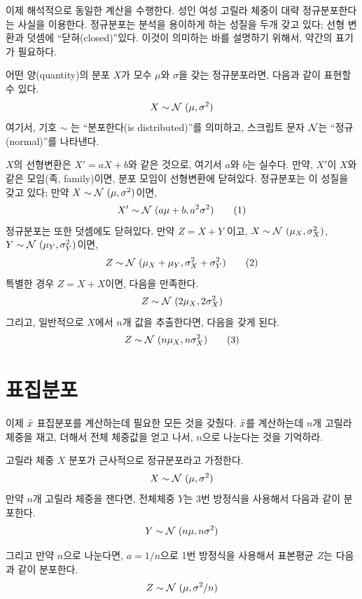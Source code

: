 이제 해석적으로 동일한 계산을 수행한다. 성인 여성 고릴라 체중이 대략 정규분포한다는 사실을 이용한다.
정규분포는 분석을 용이하게 하는 성질을 두개 갖고 있다; 선형 변환과 덧셈에 ``닫혀(closed)''있다.
이것이 의미하는 바를 설명하기 위해서, 약간의 표기가 필요하다. 

어떤 양(quantity)의 분포 $X$가 모수 $\mu$와 $\sigma$을 갖는 정규분포라면, 다음과 같이 표현할 수 있다.
%
\[ X \sim \mathcal{N}~(\mu, \sigma^{2})\]
%
여기서, 기호 $\sim$ 는 ``분포한다(is distributed)''를 의미하고, 스크립트 문자 $\mathcal{N}$는 ``정규(normal)''를 나타낸다.

$X$의 선형변환은 $X' = a X + b$와 같은 것으로, 여기서 $a$와 $b$는 실수다.
만약, $X'$이 $X$와 같은 모임(족, family)이면, 분포 모임이 선형변환에 닫혀있다. 정규분포는 이 성질을 갖고 있다; 만약 $X \sim \mathcal{N}~(\mu,
\sigma^2)$이면,
%
\[ X' \sim \mathcal{N}~(a \mu + b, a^{2} \sigma^2) \tag*{(1)} \]
%
정규분포는 또한 덧셈에도 닫혀있다.
만약 $Z = X + Y$ 이고, $X \sim \mathcal{N}~(\mu_{X}, \sigma_{X}^{2})$, $Y \sim \mathcal{N}~(\mu_{Y}, \sigma_{Y}^{2})$이면,
%
\[ Z \sim \mathcal{N}~(\mu_X + \mu_Y, \sigma_X^2 + \sigma_Y^2)  \tag*{(2)}\]
%
특별한 경우 $Z = X + X$이면, 다음을 만족한다.
%
\[ Z \sim \mathcal{N}~(2 \mu_X, 2 \sigma_X^2) \]
%
그리고, 일반적으로 $X$에서 $n$개 값을 추출한다면, 다음을 갖게 된다.
%
\[ Z \sim \mathcal{N}~(n \mu_X, n \sigma_X^2)  \tag*{(3)}\]


\section{표집분포}

이제 $\bar{x}$ 표집분포를 계산하는데 필요한 모든 것을 갖췄다. $\bar{x}$를 계산하는데 $n$개 고릴라 체중을 재고, 더해서 전체 체중값을 얻고 나서, $n$으로 나눈다는 것을 기억하라.

고릴라 체중 $X$ 분포가 근사적으로 정규분포라고 가정한다.
%
\[ X \sim \mathcal{N}~(\mu, \sigma^2)\]
%
만약 $n$개 고릴라 체중을 잰다면, 전체체중 $Y$는 3번 방정식을 사용해서 다음과 같이 분포한다.
%
\[ Y \sim \mathcal{N}~(n \mu, n \sigma^2) \]
%

그리고 만약 $n$으로 나눈다면, $a = 1/n$으로 1번 방정식을 사용해서 표본평균 $Z$는 다음과 같이 분포한다.
%
\[ Z \sim \mathcal{N}~(\mu, \sigma^2/n) \]
%

